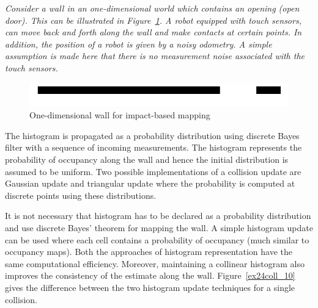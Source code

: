 \begin{exmp}
{\it Consider a wall in an one-dimensional world which contains an opening (open door). This can be illustrated in Figure~\ref{wall_example3}. A robot equipped with touch sensors, can move back and forth along the wall and make contacts at certain points. In addition, the position of a robot is given by a noisy odometry. A simple assumption is made here that there is no measurement noise associated with the touch sensors.}
\begin{figure}[H]
\centering
\includegraphics[scale=0.45]{./images/wall_example3.png}
\caption[A simple 1-D wall for impact-based mapping]{One-dimensional wall for impact-based mapping}
\label{wall_example3}
\end{figure}

\qquad The histogram is propagated as a probability distribution using discrete Bayes filter with a sequence of incoming measurements. The histogram represents the probability of occupancy along the wall and hence the initial distribution is assumed to be uniform. Two possible implementations of a collision update are Gaussian update and triangular update where the probability is computed at discrete points using these distributions. 

It is not necessary that histogram has to be declared as a probability distribution and use discrete Bayes' theorem for mapping the wall. A simple histogram update can be used where each cell contains a probability of occupancy (much similar to occupancy maps). Both the approaches of histogram representation have the same computational efficiency. Moreover, maintaining a collinear histogram also improves the consistency of the estimate along the wall. Figure~\ref{ex24coll_10} gives the difference between the two histogram update techniques for a single collision.


\end{exmp}
